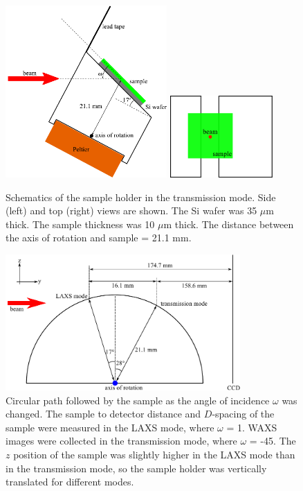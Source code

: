 \begin{figure}[htbp]
  \centering
  \includegraphics[width=0.55\textwidth]{figures/ripple/MMs/transmission/holder_side}
  \includegraphics[width=0.35\textwidth]{figures/ripple/MMs/transmission/holder_top}
  \caption{Schematics of the sample holder in the transmission mode.
  Side (left) and top (right) views are shown. The Si wafer
  was 35 $\mu$m thick. The sample thickness was 10 $\mu$m thick. The
  distance between the axis of rotation and sample = 21.1 mm.}
  \label{fig:holder_schematic}
\end{figure}

\begin{figure}[htbp]
  \centering
  \includegraphics[width=0.8\textwidth]{figures/ripple/MMs/transmission/sgeometry}
  \caption{Circular path followed by the sample 
  as the angle of incidence $\omega$ was changed. The sample to detector distance and 
  $D$-spacing of the sample were measured in the LAXS mode, 
  where $\omega$ = 1\textdegree.
  WAXS images were collected in the transmission mode, where $\omega$ = -45\textdegree. 
  The $z$ position of the sample was
  slightly higher in the LAXS mode than in the transmission mode, so the 
  sample holder was vertically translated for different modes.}
  \label{fig:sgeometry}
\end{figure}
\newpage
